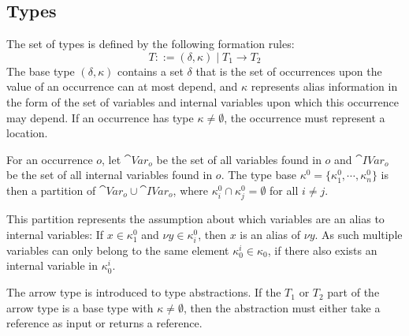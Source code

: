 \documentclass{llncs}
\newcommand{\set}[1]{\ensuremath{\{ #1 \}}}
\newcommand{\refc}{\ensuremath{\textrm{ref}\xspace}}
\begin{document}
\subsection{Types}\label{sec:types}

The set of types  is defined by the following formation rules:
%
\[ T ::=(\delta,\kappa)\mid T_1 \rightarrow T_2 \]
%
The base type $(\delta,\kappa)$ contains a set $\delta$ that is the
set of occurrences upon the value of an occurrence can at most depend,
and $\kappa$ represents alias information in the form of the set of
variables and internal variables upon which this occurrence may
depend. If an occurrence has type $\kappa \neq \emptyset$,
the occurrence must represent a location.

\begin{definition}
	For an occurrence $o$, let $\cat{Var}_o$ be the set of all
        variables found in $o$ and $\cat{IVar}_o$ be the set of all
        internal variables found in $o$.
	The type base $\kappa^0=\{\kappa^0_1,\cdots,\kappa^0_n\}$ is
        then a partition of $\cat{Var}_o \cup \cat{IVar}_o$, where
        $\kappa_i^0\cap\kappa_j^0=\emptyset$ for all $i\neq j$. 
\end{definition}
This partition represents the assumption about which variables are
an alias to internal variables: If $x \in \kappa^0_1$ and
$\nu y \in \kappa^0_i$, then $x$ is an alias of $\nu y$.
As such multiple variables can only belong to the same element
$\kappa_0^i\in\kappa_0$, if there also exists an internal variable in
$\kappa_0^i$. 

The arrow type is introduced to type abstractions.
If the $T_1$ or $T_2$ part of the arrow type is a base type with $\kappa \neq \emptyset$,
then the abstraction must either take a reference as input or returns a reference.


\end{document}
